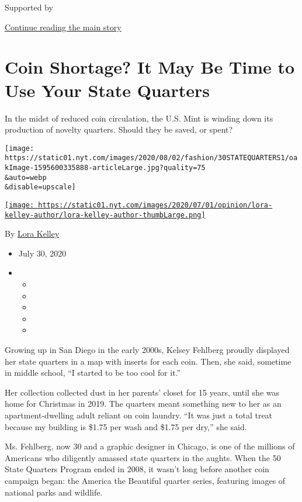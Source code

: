 Supported by

\protect\hyperlink{after-sponsor}{Continue reading the main story}

\hypertarget{coin-shortage-it-may-be-time-to-use-your-state-quarters}{%
\section{Coin Shortage? It May Be Time to Use Your State
Quarters}\label{coin-shortage-it-may-be-time-to-use-your-state-quarters}}

In the midst of reduced coin circulation, the U.S. Mint is winding down
its production of novelty quarters. Should they be saved, or spent?

\texttt{[image: https://static01.nyt.com/images/2020/08/02/fashion/30STATEQUARTERS1/oakImage-1595600335888-articleLarge.jpg?quality=75\\\&auto=webp\\\&disable=upscale]}

\href{https://www.nytimes.com/by/lora-kelley}{\texttt{[image: https://static01.nyt.com/images/2020/07/01/opinion/lora-kelley-author/lora-kelley-author-thumbLarge.png]}}

By \href{https://www.nytimes.com/by/lora-kelley}{Lora Kelley}

\begin{itemize}
\item
  July 30, 2020
\item
  \begin{itemize}
  \item
  \item
  \item
  \item
  \item
  \end{itemize}
\end{itemize}

Growing up in San Diego in the early 2000s, Kelsey Fehlberg proudly
displayed her state quarters in a map with inserts for each coin. Then,
she said, sometime in middle school, ``I started to be too cool for
it.''

Her collection collected dust in her parents' closet for 15 years, until
she was home for Christmas in 2019. The quarters meant something new to
her as an apartment-dwelling adult reliant on coin laundry. ``It was
just a total treat because my building is \$1.75 per wash and \$1.75 per
dry,'' she said.

Ms. Fehlberg, now 30 and a graphic designer in Chicago, is one of the
millions of Americans who diligently amassed state quarters in the
aughts. When the 50 State Quarters Program ended in 2008, it wasn't long
before another coin campaign began: the America the Beautiful quarter
series, featuring images of national parks and wildlife.

